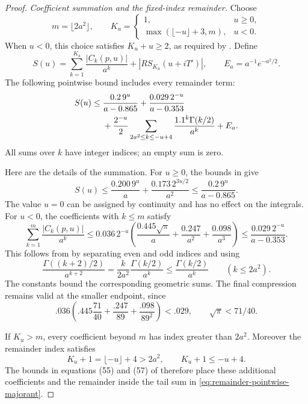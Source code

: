 \documentclass[11pt]{article}
\theoremstyle{remark}
\numberwithin{equation}{section}
\begin{document}
\begin{proof}
\emph{Coefficient summation and the fixed-index remainder.}
Choose
\[
 m=\lfloor2a^2\rfloor,\qquad
 K_u=\begin{cases}
 1,&u\ge0,\\
 \max(\lfloor-u\rfloor+3,m),&u<0.
 \end{cases}
\]
When $u<0$, this choice satisfies $K_u+u\ge2$, as required by
\cite[equation (57)]{polymath}.  Define
\[
 S(u)=\sum_{k=1}^{K_u}\frac{|C_k(p,u)|}{a^k}
                     +|RS_{K_u}(u+iT')|,
 \qquad E_a=a^{-1}e^{-a^2/2}.
\]
The following pointwise bound includes every remainder term:
\begin{align}
 S(u)\le{}&
 \frac{0.2\,9^u}{a-0.865}
 +\frac{0.029\,2^{-u}}{a-0.353}\notag\\
 &+\frac{2^{-u}}2
       \sum_{2a^2\le k\le-u+4}
          \frac{1.1^k\Gamma(k/2)}{a^k}
 +E_a.
 \label{eq:remainder-pointwise-majorant}
\end{align}
All sums over $k$ have integer indices; an empty sum is zero.

Here are the details of the summation.  For $u\ge0$, the bounds in
\cite[equations (54) and (56)]{polymath} give
\[
 S(u)\le\frac{0.200\,9^u}{a}
          +\frac{0.173\,2^{3u/2}}{a^2}
 \le\frac{0.2\,9^u}{a-0.865}.
\]
The value $u=0$ can be assigned by continuity and has no effect on
the integrals.  For $u<0$, the coefficients with $k\le m$ satisfy
\[
 \sum_{k=1}^{m}\frac{|C_k(p,u)|}{a^k}
 \le 0.036\,2^{-u}
 \left(\frac{0.445\sqrt\pi}{a}
       +\frac{0.247}{a^2}+\frac{0.098}{a^3}\right)
 \le\frac{0.029\,2^{-u}}{a-0.353}.
\]
This follows from \cite[equation (55)]{polymath} by separating even
and odd indices and using
\[
 \frac{\Gamma((k+2)/2)}{a^{k+2}}
 =\frac{k}{2a^2}\frac{\Gamma(k/2)}{a^k}
 \le\frac{\Gamma(k/2)}{a^k}
 \qquad(k\le2a^2).
\]
The constants bound the corresponding geometric sums. The final
compression remains valid at the smaller endpoint, since
\[
 .036\left(.445\frac{71}{40}+
              \frac{.247}{89}+\frac{.098}{89^2}\right)<.029,
 \qquad \sqrt\pi<71/40.
\]

If $K_u>m$, every coefficient beyond $m$ has index greater than
$2a^2$.  Moreover the remainder index satisfies
\[
 K_u+1=\lfloor-u\rfloor+4>2a^2,
 \qquad K_u+1\le-u+4.
\]
The bounds in equations (55) and (57) of \cite{polymath} therefore
place these additional coefficients and the remainder inside the
tail sum in \eqref{eq:remainder-pointwise-majorant}.


\end{proof}
\end{document}
